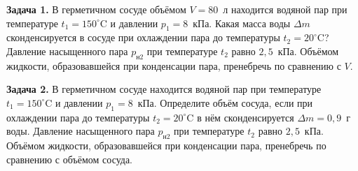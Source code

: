 
\begin{taskbasic}[code={\label{task:mkt_hum_v1_n24}}]
\textbf{Задача 1.} В герметичном сосуде объёмом $V = 80$~л находится водяной пар при температуре $t_1 = 150^{\circ}\text{C}$ и давлении $p_1 = 8$~кПа. Какая масса воды $\Delta m$ сконденсируется в сосуде при охлаждении пара до температуры $t_2 = 20^{\circ}\text{C}$? Давление насыщенного пара $p_{\text{н}2}$ при температуре $t_2$ равно $2{,}5$~кПа. Объёмом жидкости, образовавшейся при конденсации пара, пренебречь по сравнению с $V$.

\end{taskbasic}

\begin{taskbasic}[code={\label{task:mkt_hum_v2_n24}}]
\textbf{Задача 2.} В герметичном сосуде находится водяной пар при температуре $t_1 = 150^{\circ}\text{C}$ и давлении $p_1 = 8$~кПа. Определите объём сосуда, если при охлаждении пара до температуры $t_2 = 20^{\circ}\text{C}$ в нём сконденсируется $\Delta m = 0{,}9$~г воды. Давление насыщенного пара $p_{\text{н}2}$ при температуре $t_2$ равно $2{,}5$~кПа. Объёмом жидкости, образовавшейся при конденсации пара, пренебречь по сравнению с объёмом сосуда.

\end{taskbasic}


